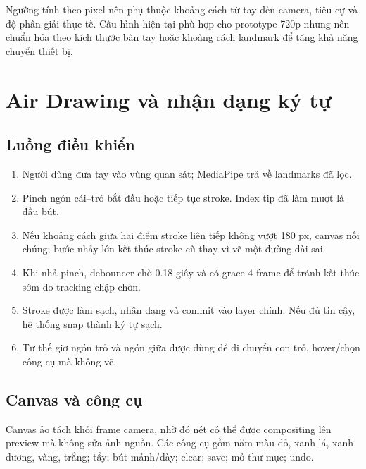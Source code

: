 \documentclass[12pt,a4paper,oneside]{report}
\begin{document}
\begin{redbox}
Ngưỡng tính theo pixel nên phụ thuộc khoảng cách từ tay đến camera, tiêu cự và độ phân giải thực tế. Cấu hình hiện tại phù hợp cho prototype 720p nhưng nên chuẩn hóa theo kích thước bàn tay hoặc khoảng cách landmark để tăng khả năng chuyển thiết bị.
\end{redbox}

\chapter{Air Drawing và nhận dạng ký tự}

\section{Luồng điều khiển}

\begin{enumerate}
  \item Người dùng đưa tay vào vùng quan sát; MediaPipe trả về landmarks đã lọc.
  \item Pinch ngón cái--trỏ bắt đầu hoặc tiếp tục stroke. Index tip đã làm mượt là đầu bút.
  \item Nếu khoảng cách giữa hai điểm stroke liên tiếp không vượt 180 px, canvas nối chúng; bước nhảy lớn kết thúc stroke cũ thay vì vẽ một đường dài sai.
  \item Khi nhả pinch, debouncer chờ 0.18 giây và có grace 4 frame để tránh kết thúc sớm do tracking chập chờn.
  \item Stroke được làm sạch, nhận dạng và commit vào layer chính. Nếu đủ tin cậy, hệ thống snap thành ký tự sạch.
  \item Tư thế giơ ngón trỏ và ngón giữa được dùng để di chuyển con trỏ, hover/chọn công cụ mà không vẽ.
\end{enumerate}

\section{Canvas và công cụ}

Canvas ảo tách khỏi frame camera, nhờ đó nét có thể được compositing lên preview mà không sửa ảnh nguồn. Các công cụ gồm năm màu đỏ, xanh lá, xanh dương, vàng, trắng; tẩy; bút mảnh/dày; clear; save; mở thư mục; undo.
\end{document}
